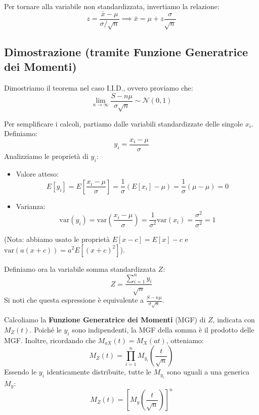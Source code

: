 \documentclass[openany,a4paper,12pt]{book}
\theoremstyle{remark}
\begin{document}
Per tornare alla variabile non standardizzata, invertiamo la relazione:
\[
z = \frac{\bar{x}-\mu}{\sigma/\sqrt{n}} \implies \bar{x} = \mu + z \frac{\sigma}{\sqrt{n}}
\]

\subsection*{Dimostrazione (tramite Funzione Generatrice dei Momenti)}
Dimostriamo il teorema nel caso I.I.D., ovvero proviamo che:
\[
\lim_{n \to \infty} \frac{S - n\mu}{\sigma \sqrt{n}} \sim \mathcal{N}(0,1)
\]

Per semplificare i calcoli, partiamo dalle variabili standardizzate delle singole $x_i$. Definiamo:
\[
y_i = \frac{x_i - \mu}{\sigma}
\]
Analizziamo le proprietà di $y_i$:
\begin{itemize}
    \item Valore atteso:
    \[ E[y_i] = E\left[\frac{x_i - \mu}{\sigma}\right] = \frac{1}{\sigma}(E[x_i] - \mu) = \frac{1}{\sigma}(\mu - \mu) = 0 \]
    \item Varianza:
    \[ \text{var}(y_i) = \text{var}\left(\frac{x_i - \mu}{\sigma}\right) = \frac{1}{\sigma^2}\text{var}(x_i) = \frac{\sigma^2}{\sigma^2} = 1 \]
\end{itemize}
(Nota: abbiamo usato le proprietà $E[x-c] = E[x]-c$ e $\text{var}(a(x+c)) = a^2E[{(x+c)}^2]$).

Definiamo ora la variabile somma standardizzata $Z$:
\[
Z = \frac{\sum_{i=1}^{n} y_i}{\sqrt{n}}
\]
Si noti che questa espressione è equivalente a $\frac{S - n\mu}{\sigma\sqrt{n}}$.

Calcoliamo la \textbf{Funzione Generatrice dei Momenti} (MGF) di $Z$, indicata con $M_Z(t)$.
Poiché le $y_i$ sono indipendenti, la MGF della somma è il prodotto delle MGF. Inoltre, ricordando che $M_{aX}(t) = M_X(at)$, otteniamo:
\begin{equation}
M_Z(t) = \prod_{i=1}^n M_{y_i}\left(\frac{t}{\sqrt{n}}\right)
\end{equation}
Essendo le $y_i$ identicamente distribuite, tutte le $M_{y_i}$ sono uguali a una generica $M_y$:
\begin{equation}
M_Z(t) = \left[ M_y\left(\frac{t}{\sqrt{n}}\right) \right]^n
\end{equation}
\end{document}
